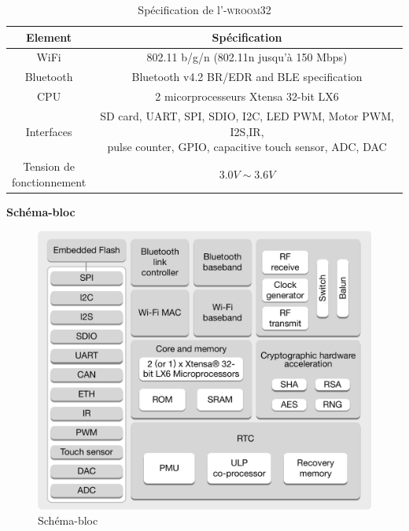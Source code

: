     \begin{table}[H]
        \centering
        \begin{tabular}{|c|c|}
            \hline
            \rowcolor{lightgray}
            Element & Spécification\\ \hline
            WiFi & 802.11 b/g/n (802.11n jusqu'à 150 Mbps)\\ \hline
            Bluetooth & Bluetooth v4.2 BR/EDR and BLE specification\\ \hline
            CPU & 2 micorprocesseurs Xtensa \up{\tiny{\textregistered}} 32-bit LX6\\ \hline
            Interfaces & \makecell{SD card, UART, SPI, SDIO, I2C, LED PWM, Motor PWM, I2S,IR, \\
                pulse counter, GPIO, capacitive touch sensor, ADC, DAC}\\ \hline
            \makecell{Tension de \\fonctionnement} & $3.0V \sim 3.6V$\\ \hline
        \end{tabular}
        \caption{Spécification de l'\esp\textsc{-wroom32} \cite{esp32WROOM_datasheet}}
        \label{spec}
    \end{table}
    \textbf{Schéma-bloc}
    \begin{figure}[H]
        \centering
        \includegraphics[scale=0.15]{images/esp32-blockDiagram.png}
        \caption{Schéma-bloc \cite{esp32_datasheet}}
    \end{figure}

